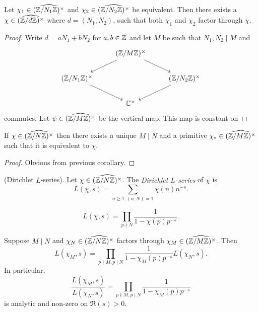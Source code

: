\documentclass{memoir}
\begin{document}
\begin{corollary}
    Let $\chi_1\in\widehat{(\mathbb{Z}/N_1\mathbb{Z})^\times}$ and $\chi_2\in\widehat{(\mathbb{Z}/N_2\mathbb{Z})^\times}$ be equivalent.
    Then there exists a $\chi\in \widehat{(\mathbb{Z}/d\mathbb{Z})^\times}$ where $d = (N_1,N_2)$, such that both $\chi_1$ and $\chi_2$ factor through $\chi$.
\end{corollary}
\begin{proof}
    Write $d = aN_1+bN_2$ for $a,b\in \mathbb{Z}$ and let $M$ be such that $N_1,N_2\mid M$ and 
    \begin{equation}
        \begin{tikzcd}
            & (\Z/M\Z)^\times \arrow[dl] \arrow[dr]& \\
            (\Z/N_1\Z)^\times \arrow[dr] & & (\Z/N_2\Z)^\times \arrow[dl] \\
                            & \C^\times &
        \end{tikzcd}
    \end{equation}
    commutes.
    Let $\psi\in\widehat{(\mathbb{Z}/M\mathbb{Z})^\times}$ be the vertical map.
    This map is constant on 
\end{proof}
\begin{corollary}
    If $\chi\in\widehat{(\mathbb{Z}/N\mathbb{Z})^\times}$ then there exists a unique $M\mid N$ and a primitive $\chi_*\in\widehat{(\mathbb{Z}/M\mathbb{Z})^\times}$ such that it is equivalent to $\chi$.
\end{corollary}
\begin{proof}
    Obvious from previous corollary.
\end{proof}
\begin{definition}
    (Dirichlet $L$-series).
    Let $\chi\in\widehat{(\mathbb{Z}/N\mathbb{Z})^\times}$. 
    The \textit{Dirichlet $L$-series} of $\chi$ is
    \begin{equation}
        L(\chi,s) = \sum_{n\ge1,(n,N)=1}\chi(n)n^{-s}.
    \end{equation}
\end{definition}
\begin{proposition}
    \begin{equation}
        L(\chi,s) = \prod_{p\nmid N} \frac1{1-\chi(p)p^{-s}}.
    \end{equation}
\end{proposition}
\begin{proposition}
    Suppose $M\mid N$ and $\chi_N\in\widehat{(\mathbb{Z}/N\mathbb{Z})^\times}$ factors through $\chi_M\in\widehat{(\mathbb{Z}/M\mathbb{Z})^\times}$.
    Then
    \begin{equation}
        L(\chi_M,s) = \prod_{p\nmid M,p\mid N} \frac1{1-\chi_M(p)p^{-s}}L(\chi_N,s).
    \end{equation}
    In particular,
    \begin{equation}
        \frac{L(\chi_M,s)}{L(\chi_N,s)} = \prod_{p\nmid M,p\mid N} \frac1{1-\chi_M(p)p^{-s}}
    \end{equation}
    is analytic and non-zero on $\Re(s)>0$.
\end{proposition}
\end{document}
